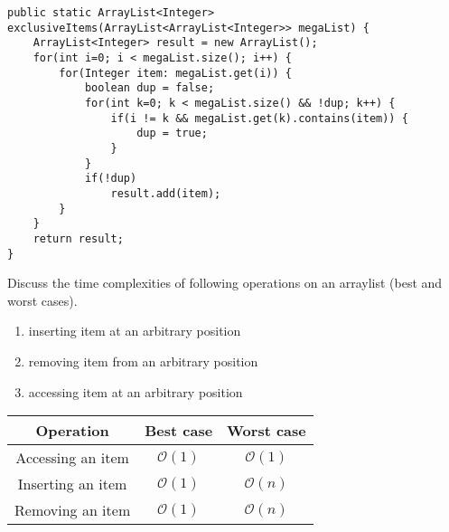 \begin{questions}
\begin{solution}
\begin{lstlisting}
public static ArrayList<Integer> exclusiveItems(ArrayList<ArrayList<Integer>> megaList) {
	ArrayList<Integer> result = new ArrayList();
	for(int i=0; i < megaList.size(); i++) {
		for(Integer item: megaList.get(i)) {
			boolean dup = false;
			for(int k=0; k < megaList.size() && !dup; k++) {
				if(i != k && megaList.get(k).contains(item)) {
					dup = true;
				}	
			}
			if(!dup) 
				result.add(item);
		}
	}
	return result;
}
\end{lstlisting}
\end{solution}

\question Discuss the time complexities of following operations on an arraylist (best and worst cases).

\begin{enumerate}
  \item inserting item at an arbitrary position
  \item removing item from an arbitrary position
  \item accessing item at an arbitrary position
\end{enumerate}

\ifprintanswers
\Large
\begin{center}
  \begin{tabular}{c|c|c}
    Operation & Best case & Worst case\\
    \hline
    Accessing an item &  $\mathcal{O}(1)$ & \color{green!90!black} $\mathcal{O}(1)$ \color{black}\\
    \hline
    Inserting an item & \color{green!90!black} $\mathcal{O}(1)$ \color{black} & \color{red} $\mathcal{O}(n)$ \color{black} \\
    \hline
    Removing an item & \color{green!90!black} $\mathcal{O}(1)$ \color{black} & \color{red} $\mathcal{O}(n)$ \color{black}
  \end{tabular}
\end{center}
\normalsize
\else
\fi
\end{questions}
	

